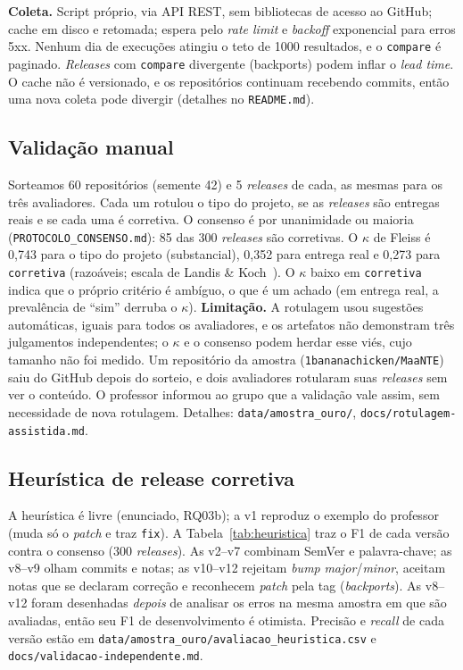 \textbf{Coleta.} Script próprio, via API REST, sem bibliotecas de acesso ao GitHub; cache em disco e retomada;
espera pelo \textit{rate limit} e \textit{backoff} exponencial para erros 5xx. Nenhum dia de execuções atingiu
o teto de 1000 resultados, e o \texttt{compare} é paginado. \textit{Releases} com \texttt{compare}
divergente (backports) podem inflar o \textit{lead time}. O cache não é versionado, e os repositórios continuam recebendo commits, então uma nova coleta pode divergir
(detalhes no \texttt{README.md}).

\subsection{Validação manual}
Sorteamos 60 repositórios (semente 42) e 5 \textit{releases} de cada, as mesmas
para os três avaliadores. Cada um rotulou o tipo do projeto, se as \textit{releases} são entregas reais e se
cada uma é corretiva. O consenso é por unanimidade ou maioria (\texttt{PROTOCOLO\_CONSENSO.md}): 85 das 300
\textit{releases} são corretivas. O $\kappa$ de Fleiss é 0,743 para o tipo do projeto (substancial), 0,352 para
entrega real e 0,273 para \texttt{corretiva} (razoáveis; escala de Landis \& Koch~\cite{landis1977kappa}).
O $\kappa$ baixo em \texttt{corretiva} indica que o próprio critério é ambíguo, o que é um achado (em entrega
real, a prevalência de ``sim'' derruba o $\kappa$).
\textbf{Limitação.} A rotulagem usou sugestões automáticas, iguais para todos os avaliadores, e os artefatos
não demonstram três julgamentos independentes; o $\kappa$ e o consenso podem herdar esse viés, cujo tamanho não
foi medido. Um repositório da amostra (\texttt{1bananachicken/MaaNTE}) saiu do GitHub depois do sorteio, e
dois avaliadores rotularam suas \textit{releases} sem ver o conteúdo.
O professor informou ao grupo que a validação vale
assim, sem necessidade de nova rotulagem. Detalhes: \texttt{data/amostra\_ouro/},
\texttt{docs/rotulagem-assistida.md}.

\subsection{Heurística de release corretiva}\label{sec:heuristica}
A heurística é livre (enunciado, RQ03b); a v1 reproduz o exemplo do professor (muda só o \textit{patch} e traz
\texttt{fix}). A Tabela~\ref{tab:heuristica} traz o F1 de cada versão contra o consenso (300 \textit{releases}).
As v2--v7 combinam SemVer e palavra-chave; as v8--v9 olham commits e notas; as v10--v12 rejeitam
\textit{bump} \emph{major}/\emph{minor}, aceitam notas que se declaram correção e reconhecem \textit{patch} pela
tag (\textit{backports}). As v8--v12 foram desenhadas \emph{depois} de analisar os erros na mesma amostra em
que são avaliadas, então seu F1 de desenvolvimento é otimista. Precisão e \textit{recall} de cada versão estão em
\texttt{data/amostra\_ouro/avaliacao\_heuristica.csv} e \texttt{docs/validacao-independente.md}.

